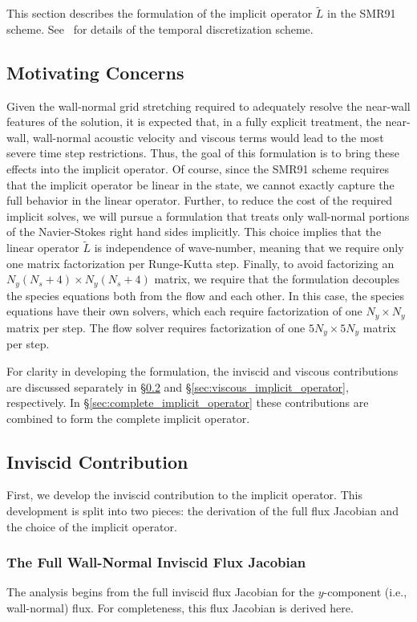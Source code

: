 This section describes the formulation of the implicit operator
$\tilde{L}$ in the SMR91 scheme.  See~\cite{?} for details of the
temporal discretization scheme.

\subsection{Motivating Concerns}
Given the wall-normal grid stretching required to adequately resolve
the near-wall features of the solution, it is expected that, in a
fully explicit treatment, the near-wall, wall-normal acoustic velocity
and viscous terms would lead to the most severe time step
restrictions.  Thus, the goal of this formulation is to bring these
effects into the implicit operator.  Of course, since the SMR91 scheme
requires that the implicit operator be linear in the state, we cannot
exactly capture the full behavior in the linear operator.  Further, to
reduce the cost of the required implicit solves, we will pursue a
formulation that treats only wall-normal portions of the Navier-Stokes
right hand sides implicitly.  This choice implies that the linear
operator $\tilde{L}$ is independence of wave-number, meaning that we
require only one matrix factorization per Runge-Kutta step.
Finally, to avoid factorizing an $N_y (N_s + 4) \times N_y (N_s + 4)$
matrix, we require that the formulation decouples the species
equations both from the flow and each other.  In this case, the
species equations have their own solvers, which each require
factorization of one $N_y \times N_y$ matrix per step.  The flow
solver requires factorization of one $5 N_y \times 5 N_y$ matrix per
step.

For clarity in developing the formulation, the inviscid and viscous
contributions are discussed separately in
\S\ref{sec:inviscid_implicit_operator} and
\S\ref{sec:viscous_implicit_operator}, respectively.  In
\S\ref{sec:complete_implicit_operator} these contributions are combined
to form the complete implicit operator.

\subsection{Inviscid Contribution}
\label{sec:inviscid_implicit_operator}
First, we develop the inviscid contribution to the implicit operator.
This development is split into two pieces: the derivation of the full
flux Jacobian and the choice of the implicit operator.

\subsubsection{The Full Wall-Normal Inviscid Flux Jacobian}
The analysis begins from the full inviscid flux Jacobian for the
$y$-component (i.e., wall-normal) flux.  For completeness, this flux
Jacobian is derived here.

